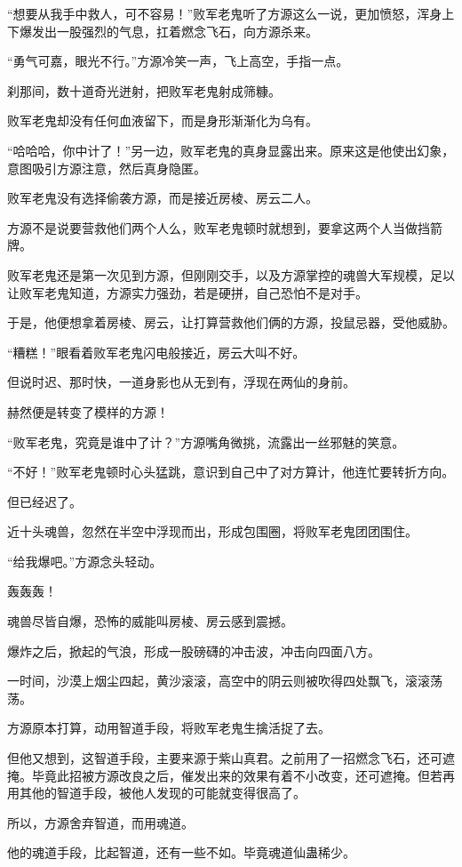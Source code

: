 \begin{this_body}
“想要从我手中救人，可不容易！”败军老鬼听了方源这么一说，更加愤怒，浑身上下爆发出一股强烈的气息，扛着燃念飞石，向方源杀来。

“勇气可嘉，眼光不行。”方源冷笑一声，飞上高空，手指一点。

刹那间，数十道奇光迸射，把败军老鬼射成筛糠。

败军老鬼却没有任何血液留下，而是身形渐渐化为乌有。

“哈哈哈，你中计了！”另一边，败军老鬼的真身显露出来。原来这是他使出幻象，意图吸引方源注意，然后真身隐匿。

败军老鬼没有选择偷袭方源，而是接近房棱、房云二人。

方源不是说要营救他们两个人么，败军老鬼顿时就想到，要拿这两个人当做挡箭牌。

败军老鬼还是第一次见到方源，但刚刚交手，以及方源掌控的魂兽大军规模，足以让败军老鬼知道，方源实力强劲，若是硬拼，自己恐怕不是对手。

于是，他便想拿着房棱、房云，让打算营救他们俩的方源，投鼠忌器，受他威胁。

“糟糕！”眼看着败军老鬼闪电般接近，房云大叫不好。

但说时迟、那时快，一道身影也从无到有，浮现在两仙的身前。

赫然便是转变了模样的方源！

“败军老鬼，究竟是谁中了计？”方源嘴角微挑，流露出一丝邪魅的笑意。

“不好！”败军老鬼顿时心头猛跳，意识到自己中了对方算计，他连忙要转折方向。

但已经迟了。

近十头魂兽，忽然在半空中浮现而出，形成包围圈，将败军老鬼团团围住。

“给我爆吧。”方源念头轻动。

轰轰轰！

魂兽尽皆自爆，恐怖的威能叫房棱、房云感到震撼。

爆炸之后，掀起的气浪，形成一股磅礴的冲击波，冲击向四面八方。

一时间，沙漠上烟尘四起，黄沙滚滚，高空中的阴云则被吹得四处飘飞，滚滚荡荡。

方源原本打算，动用智道手段，将败军老鬼生擒活捉了去。

但他又想到，这智道手段，主要来源于紫山真君。之前用了一招燃念飞石，还可遮掩。毕竟此招被方源改良之后，催发出来的效果有着不小改变，还可遮掩。但若再用其他的智道手段，被他人发现的可能就变得很高了。

所以，方源舍弃智道，而用魂道。

他的魂道手段，比起智道，还有一些不如。毕竟魂道仙蛊稀少。


\end{this_body}
